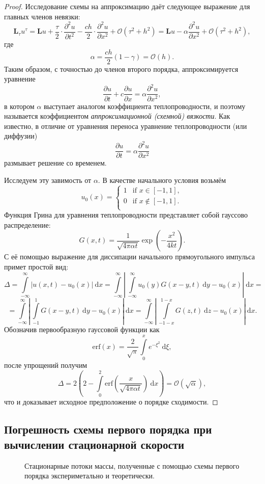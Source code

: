 \documentclass[a4paper,10pt]{article}
\newcommand{\dd}{\:\mathrm{d}}
\begin{document}
\begin{proof}
Исследование схемы на аппроксимацию даёт следующее выражение для главных членов невязки:
\[	\mathbf{L}_\tau u^\tau = \mathbf{L}u+\frac\tau2\cdot\frac{\partial^2u}{\partial t^2} - 
		\frac{ch}2\cdot\frac{\partial^2u}{\partial x^2} + \mathcal{O}(\tau^2 + h^2) = 
	\mathbf{L}u-\alpha\frac{\partial^2u}{\partial x^2} + \mathcal{O}(\tau^2 + h^2), \]
где \[ \alpha = \frac{ch}2(1-\gamma) = \mathcal{O}(h). \]
Таким образом, с точностью до членов второго порядка, аппроксимируется уравнение
\[ \frac{\partial u}{\partial t} + c\frac{\partial u}{\partial x} = \alpha\frac{\partial^2 u}{\partial x^2}, \]
в котором \( \alpha \) выступает аналогом коэффициента теплопроводности, и поэтому называется коэффициентом \textit{аппроксимационной (схемной) вязкости}.
Как известно, в отличие от уравнения переноса уравнение теплопроводности (или диффузии)
\[ \frac{\partial u}{\partial t} = \alpha\frac{\partial^2 u}{\partial x^2} \]
размывает решение со временем. 

Исследуем эту завимость от \( \alpha \). В качестве начального условия возьмём
\[ u_0(x) = 
  \begin{cases}
    1 & \text{if } x \in [-1,1],\\
    0 & \text{if } x \notin [-1,1].\\
  \end{cases} \]
Функция Грина для уравнения теплопроводности представляет собой гауссово распределение:
\[ G(x,t) = \frac1{\sqrt{4\pi\alpha t}}\exp\left(-\frac{x^2}{4kt}\right). \]
С её помощью выражение для диссипации начального прямоугольного импульса примет простой вид:
\[	\Delta = \int\limits_{-\infty}^\infty\left|u(x,t)-u_0(x)\right| \dd x =
		\int\limits_{-\infty}^\infty\left|\,\int\limits_{-\infty}^\infty u_0(y)G(x-y,t)\dd y-u_0(x)\right| \dd x = \]
	\[ =\int\limits_{-\infty}^\infty\left|\,\int\limits_{-1}^1 G(x-y,t)\dd y-u_0(x)\right| \dd x =
		\int\limits_{-\infty}^\infty\left|\,\int\limits_{-1-x}^{1-x} G(z,t)\dd z-u_0(x)\right| \dd x. \]
Обозначив первообразную гауссовой функции как
\[ \mathrm{erf}(x) = \frac2{\sqrt\pi}\int\limits_0^x e^{-\xi^2} \dd \xi, \]
после упрощений получим
\[ \Delta = 2\left(2-\int\limits_0^2 \mathrm{erf}\left(\frac{x}{\sqrt{4\pi\alpha t}}\right) \dd x\right) = \mathcal{O}(\sqrt\alpha), \]
что и доказывает исходное предположение о порядке сходимости.
\end{proof}

\subsection{Погрешность схемы первого порядка при вычислении стационарной скорости}\label{sec:first}
\begin{figure}[h]
	\caption{Стационарные потоки массы, полученные с помощью схемы первого порядка экспериметально и теоретически.}\label{fig:first_model}
\end{figure}
\end{document}
